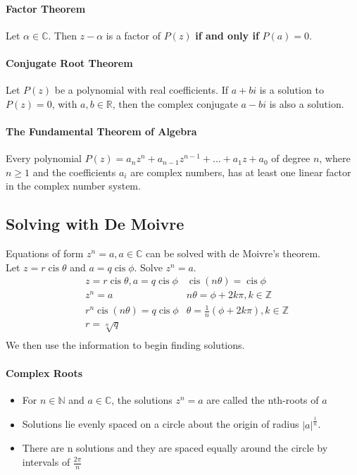 \documentclass[a4paper,twoside]{article}
\DeclareMathOperator\cis{cis}
\newenvironment{example}[1]{%
	\mbox{}\\\tcolorbox[beamer,breakable,%
		title=Example: #1,standard jigsaw,opacityback=0, colframe=blue!75!black]}{\endtcolorbox\mbox{}\\}
\begin{document}
			\paragraph{Factor Theorem} Let $\alpha\in\mathbb{C}$. Then $z-\alpha$ is a factor of $P(z)$ \textbf{if and only if} $P(a)=0$.
			\paragraph{Conjugate Root Theorem} Let $P(z)$ be a polynomial with real coefficients. If $a+bi$ is a solution to $P(z)=0$, with $a,b\in\mathbb{R}$, then the complex conjugate $a-bi$ is also a solution.
			\paragraph{The Fundamental Theorem of Algebra} Every polynomial $P(z)=a_nz^n+a_{n-1}z^{n-1}+...+a_1z+a_0$ of degree $n$, where $n\geq1$ and the coefficients $a_i$ are complex numbers, has at least one linear factor in the complex number system.
		\subsection{Solving with De Moivre}
			Equations of form $z^n=a,a\in\mathbb{C}$ can be solved with de Moivre's theorem.
			\begin{example}{de Moivre's theorem to solve basic case}
				Let $z=r\cis\theta$ and $a=q\cis\phi$. Solve $z^n=a$.
				\begin{align*}
					&z=r\cis\theta,a=q\cis\phi &\cis(n\theta)=\cis\phi\\
					&z^n=a &n\theta=\phi+2k\pi,k\in\mathbb{Z}\\
					&r^n\cis(n\theta)=q\cis\phi &\theta=\frac{1}{n} (\phi+2k\pi),k\in\mathbb{Z}\\
					&r=\sqrt[n]{q}\\
				\end{align*}
				We then use the information to begin finding solutions.
			\end{example}
		
			\paragraph{Complex Roots}
			\begin{itemize}
				\item For $n\in\mathbb{N}$ and $a\in\mathbb{C}$, the solutions $z^n=a$ are called the nth-roots of $a$
				\item Solutions lie evenly spaced on a circle about the origin of radius $|a|^{\frac{1}{n}}$.
				\item There are n solutions and they are spaced equally around the circle by intervals of $\frac{2\pi}{n}$
			\end{itemize}
			
\end{document}
